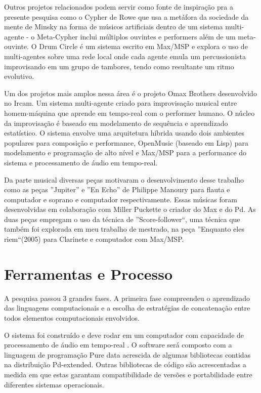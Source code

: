 \documentclass[draft]{ppgmus}
\begin{document}
Outros projetos relacionados podem servir como fonte de inspiração pra
a presente pesquisa como o Cypher \cite{rowe93:interactive}   de Rowe que usa a metáfora da
sociedade da mente de Minsky na forma de músicos artificiais dentro de
um sistema multi-agente - o Meta-Cypher inclui múltiplos ouvintes e
performers além de um meta-ouvinte.  O Drum Circle \cite{eigenfeld07:drum} é um sistema escrito em Max/MSP e explora o uso de
multi-agentes sobre uma rede local onde cada agente emula um
percussionista improvisando em um grupo de tambores, tendo como
resultante um ritmo evolutivo.

Um dos projetos mais amplos nessa área é o projeto Omax Brothers \cite{assayag06:omax}
desenvolvido no Ircam. Um sistema multi-agente criado para
improvisação musical entre homem-máquina que aprende em tempo-real com
o performer humano. O núcleo da improvisação é baseado em modelamento
de sequência e aprendizado estatístico. O sistema envolve uma
arquitetura híbrida usando dois ambientes populares para composição e
performance, OpenMusic (baseado em Lisp) para modelamento e
programação de alto nível e Max/MSP para a performance do sistema e
processamento de áudio em tempo-real.

Da parte musical diversas peças motivaram o desenvolvimento desse trabalho como as peças
''Jupiter'' e ''En Echo'' de Philippe Manoury para flauta e computador e soprano e computador respectivamente.
Essas músicas foram desenvolvidas em colaboração com Miller Puckette o criador do Max e do Pd. As duas 
peças empregam o uso da técnica de ''Score-follower``, uma técnica que também foi explorada em
meu trabalho de mestrado, na peça ''Enquanto eles riem``(2005) para Clarinete e computador com Max/MSP.


\chapter{Ferramentas e Processo}
\label{sec:metodologia}

A pesquisa passou 3 grandes fases.  A primeira fase
compreendeu o aprendizado das linguagens computacionais e a
escolha de estratégias de concatenação entre todos elementos
computacionais envolvidos. 

O sistema foi construído e deve rodar em um computador com capacidade de processamento
de áudio em tempo-real . O software será composto com
a linguagem de programação Pure data acrescida de algumas bibliotecas contidas
na distribuição Pd-extended. Outras bibliotecas de código são
acrescentadas a medida em que estas garantam compatibilidade de
versões e portabilidade entre diferentes sistemas operacionais.
\end{document}
